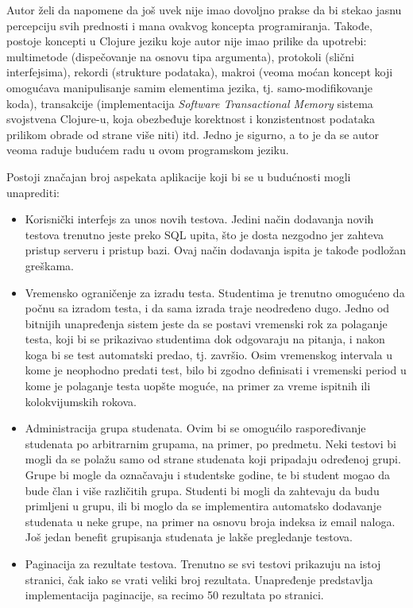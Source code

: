 Autor želi da napomene da još uvek nije imao dovoljno prakse da bi stekao jasnu percepciju svih prednosti i mana ovakvog koncepta programiranja. Takođe, postoje koncepti u Clojure jeziku koje autor nije imao prilike da upotrebi: multimetode (dispečovanje na osnovu tipa argumenta), protokoli (slični interfejsima), rekordi (strukture podataka), makroi (veoma moćan koncept koji omogućava manipulisanje samim elementima jezika, tj. samo-modifikovanje koda), transakcije (implementacija \textit{Software Transactional Memory} sistema svojstvena Clojure-u, koja obezbeđuje korektnost i konzistentnost podataka prilikom obrade od strane više niti) itd. Jedno je sigurno, a to je da se autor veoma raduje budućem radu u ovom programskom jeziku.

Postoji značajan broj aspekata aplikacije koji bi se u budućnosti mogli unaprediti:
\begin{itemize}
\item Korisnički interfejs za unos novih testova. Jedini način dodavanja novih testova trenutno jeste preko SQL upita, što je dosta nezgodno jer zahteva pristup serveru i pristup bazi. Ovaj način dodavanja ispita je takođe podložan greškama.
\item Vremensko ograničenje za izradu testa. Studentima je trenutno omogućeno da počnu sa izradom testa, i da sama izrada traje neodređeno dugo. Jedno od bitnijih unapređenja sistem jeste da se postavi vremenski rok za polaganje testa, koji bi se prikazivao studentima dok odgovaraju na pitanja, i nakon koga bi se test automatski predao, tj. završio. Osim vremenskog intervala u kome je neophodno predati test, bilo bi zgodno definisati i vremenski period u kome je polaganje testa uopšte moguće, na primer za vreme ispitnih ili kolokvijumskih rokova.
\item Administracija grupa studenata. Ovim bi se omogućilo raspoređivanje studenata po arbitrarnim grupama, na primer, po predmetu. Neki testovi bi mogli da se polažu samo od strane studenata koji pripadaju određenoj grupi. Grupe bi mogle da označavaju i studentske godine, te bi student mogao da bude član i više različitih grupa. Studenti bi mogli da zahtevaju da budu primljeni u grupu, ili bi moglo da se implementira automatsko dodavanje studenata u neke grupe, na primer na osnovu broja indeksa iz email naloga. Još jedan benefit grupisanja studenata je lakše pregledanje testova.
\item Paginacija za rezultate testova. Trenutno se svi testovi prikazuju na istoj stranici, čak iako se vrati veliki broj rezultata. Unapređenje predstavlja implementacija paginacije, sa recimo 50 rezultata po stranici.

\end{itemize}
